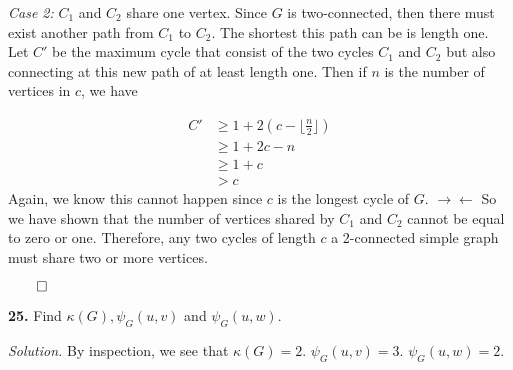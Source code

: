 \documentclass{article}
\begin{document}
\newpage
\textit{Case 2:}  \(C_1\) and \(C_2\) share one vertex. Since \(G\) is two-connected, then there must exist another path from \(C_1\) to \(C_2\). The shortest this path can be is length one. Let \(C'\) be the maximum cycle that consist of the two cycles \(C_1\) and \(C_2\) but also connecting at this new path of at least length one. Then if \(n\) is the number of vertices in \(c\), we have 

\begin{align*}
C' &\geq 1 + 2( c - \lfloor \frac{n}2 \rfloor ) \\
&\geq  1 + 2c-n\\
&\geq 1 +c \\
&> c
\end{align*}
Again, we know this cannot happen since \(c\) is the longest cycle of \(G\). \( \rightarrow\!\leftarrow\) So we have shown that the number of vertices shared by \(C_1\) and \(C_2\) cannot be equal to zero or one. Therefore, any two cycles of length \(c\) a 2-connected simple graph must share two or more vertices. 
\begin{flushright}
 \(\qed\) 
\end{flushright}






\vspace{4mm}
\textbf{25.} Find \(\kappa(G), \psi_G(u,v)\) and \(\psi_G(u,w)\). 

\vspace{3mm}
\textit{Solution.} By inspection, we see that \(\kappa(G) = 2\). \(\psi_G(u,v) = 3\). \(\psi_G(u,w)=2\). 
\end{document}
